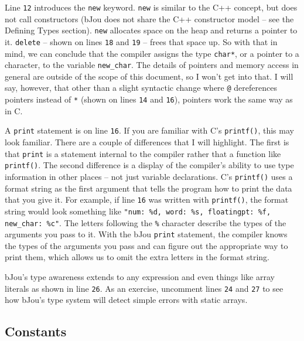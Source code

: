 \documentclass[12pt]{article}
\begin{document}
		Line \texttt{12} introduces the \texttt{new} keyword. \texttt{new} is similar to the C++ concept, but does not call constructors (bJou does not share the C++ constructor model -- see the Defining Types section). \texttt{new} allocates space on the heap and returns a pointer to it. \texttt{delete} -- shown on lines \texttt{18} and \texttt{19} -- frees that space up. So with that in mind, we can conclude that the compiler assigns the type \texttt{char*}, or a pointer to a character, to the variable \texttt{new\_char}. The details of pointers and memory access in general are outside of the scope of this document, so I won't get into that. I will say, however, that other than a slight syntactic change where \texttt{@} dereferences pointers instead of \texttt{*} (shown on lines \texttt{14} and \texttt{16}), pointers work the same way as in C.
	
		A \texttt{print} statement is on line \texttt{16}. If you are familiar with C's \texttt{printf()}, this may look familiar. There are a couple of differences that I will highlight. The first is that \texttt{print} is a statement internal to the compiler rather that a function like \texttt{printf()}. The second difference is a display of the compiler's ability to use type information in other places -- not just variable declarations. C's \texttt{printf()} uses a format string as the first argument that tells the program how to print the data that you give it. For example, if line \texttt{16} was written with \texttt{printf()}, the format string would look something like \texttt{"num: \%d, word: \%s, floatingpt: \%f, new\_char: \%c"}. The letters following the \texttt{\%} character describe the types of the arguments you pass to it. With the bJou \texttt{print} statement, the compiler knows the types of the arguments you pass and can figure out the appropriate way to print them, which allows us to omit the extra letters in the format string.

		bJou's type awareness extends to any expression and even things like array literals as shown in line \texttt{26}. As an exercise, uncomment lines \texttt{24} and \texttt{27} to see how bJou's type system will detect simple errors with static arrays.
	
	\subsection*{Constants}
		\begin{centering}
			\inputminted[breaklines, fontsize=\small, baselinestretch=0.8, frame=lines, linenos]{bash}{"../tests/test/demo2.bjou"}
		\end{centering}
\end{document}
